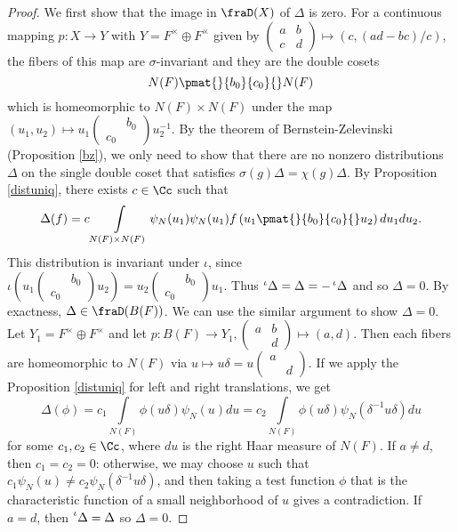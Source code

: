 \documentclass{article}
\newcommand{\pre}[1]{\prescript{#1}{}}
\newcommand{\smat}[4]{\left(\begin{smallmatrix} #1 & #2 \\ #3 & #4 \end{smallmatrix}\right)}
\begin{document}
\begin{proof}
We first show that the image in $\fraD(X)$ of $\Delta$ is zero. 
For a continuous mapping $p:X\to Y$ with $Y = F^{\times} \oplus F^{\times}$ given by $\smat{a}{b}{c}{d} \mapsto (c, (ad-bc)/c)$, the fibers of this map are $\sigma$-invariant and they are the double cosets 
$$
N(F) \pmat{}{b_{0}}{c_{0}}{} N(F)
$$
which is homeomorphic to $N(F)\times N(F)$ under the map $(u_{1}, u_{2})\mapsto u_{1} \smat{}{b_{0}}{c_{0}}{} u_{2}^{-1}$. By the theorem of Bernstein-Zelevinski (Proposition \ref{bz}), we only need to show that there are no nonzero distributions $\Delta$ on the single double coset that satisfies $\sigma(g)\Delta = \chi(g)\Delta$. 
By Proposition \ref{distuniq}, there exists $c\in \Cc$ such that 
$$
\Delta(f) = c \int\limits_{N(F)\times N(F)} \psi_{N}(u_{1})\psi_{N}(u_{1}) f\left( u_{1} \pmat{}{b_{0}}{c_{0}}{} u_{2}\right) du_{1}du_{2}.
$$
This distribution is invariant under $\iota$, since $\iota\left( u_{1} \smat{}{b_{0}}{c_{0}}{} u_{2}\right) = u_{2}\smat{}{b_{0}}{c_{0}}{} u_{1}$. Thus $\pre{\iota}{}\Delta = \Delta = -\pre{\iota}{}\Delta$ and so $\Delta = 0$. 
By exactness, $\Delta \in \fraD(B(F))$. We can use the similar argument to show $\Delta = 0$. 
Let $Y_{1} =F^{\times} \oplus F^{\times}$ and let $p:B(F) \to Y_{1}, \smat{a}{b}{}{d} \mapsto (a, d)$. 
Then each fibers are homeomorphic to $N(F)$ via $u\mapsto u\delta = u\smat{a}{}{}{d}$. If we apply the Proposition \ref{distuniq} for left and right translations, we get
$$
\Delta(\phi) = c_{1}\int\limits_{N(F)} \phi(u\delta)\psi_{N}(u)du = c_{2} \int\limits_{N(F)} \phi(u\delta) \psi_{N}(\delta^{-1}u\delta) du
$$
for some $c_{1}, c_{2}\in \Cc$, where $du$ is the right Haar measure of $N(F)$. If $a\neq d$, then $c_{1} =c_{2} = 0$: otherwise, we may choose $u$ such that $c_{1}\psi_{N}(u) \neq c_{2}\psi_{N}(\delta^{-1}u\delta)$, and then taking a test function $\phi$ that is the characteristic function of a small neighborhood of $u$ gives a contradiction. 
If $a = d$, then $\pre{\iota}\Delta = \Delta$ so $\Delta = 0$. 
\end{proof}
\end{document}
